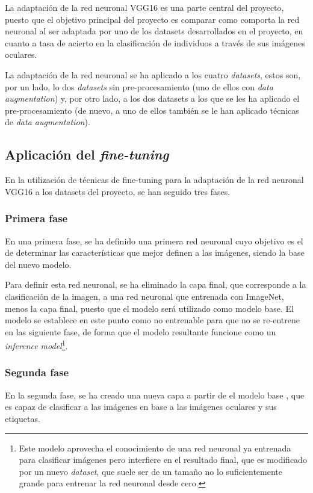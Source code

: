 La adaptación de la red neuronal VGG16 es una parte central del proyecto, puesto que el objetivo principal del proyecto es comparar como comporta la red neuronal al ser adaptada por uno de los datasets desarrollados en el proyecto, en cuanto a tasa de acierto en la clasificación de individuos a través de sus imágenes oculares. 

La adaptación de la red neuronal se ha aplicado a los cuatro \textit{datasets}, estos son, por un lado, lo dos \textit{datasets} sin pre-procesamiento (uno de ellos con \textit{data augmentation}) y, por otro lado, a los dos datasets a los que se les ha aplicado el pre-procesamiento (de nuevo, a uno de ellos también se le han aplicado técnicas de \textit{data augmentation}). 
\subsection{Aplicación del \textit{fine-tuning}}

En la  utilización de técnicas de fine-tuning para la adaptación de la red neuronal VGG16 a los datasets del proyecto, se han seguido tres fases. 

\subsubsection{Primera fase}
En una primera fase, se ha definido una primera red neuronal cuyo objetivo es el de determinar las características que mejor definen a las imágenes, siendo la base del nuevo modelo. 

Para definir esta red neuronal, se ha eliminado la capa final, que corresponde a la clasificación de la imagen, a una red neuronal que entrenada con ImageNet, menos la capa final, puesto que el modelo será utilizado como modelo base. El modelo se establece en este punto como no entrenable para que no se re-entrene en las siguiente fase, de forma que el modelo resultante funcione como un \textit{inference model}\footnote{Este modelo aprovecha el conocimiento de una red neuronal ya entrenada para clasificar imágenes pero interfiere en el resultado final, que es modificado por un nuevo \textit{dataset}, que suele ser de un tamaño no lo suficientemente grande para entrenar la red neuronal desde cero.}. 

\subsubsection{Segunda fase}

En la segunda fase, se ha creado una nueva capa a partir de el modelo base , que es capaz de clasificar a las imágenes en base a las imágenes oculares y sus etiquetas. 

